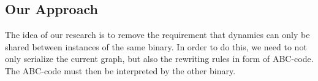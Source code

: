 \documentclass[a4paper]{article}
\begin{document}
\subsection{Our Approach}
The idea of our research is to remove the requirement that dynamics can only be shared between instances of the same binary.
In order to do this, we need to not only serialize the current graph, but also the rewriting rules in form of ABC-code.
The ABC-code must then be interpreted by the other binary.

\printbibliography
\end{document}
